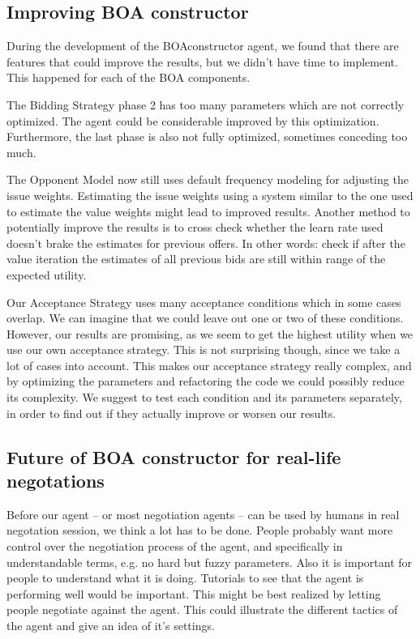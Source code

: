 \subsection{Improving BOA constructor}
During the development of the BOAconstructor agent, we found that there are features that could improve the results, but we didn't have time to implement. This happened for each of the BOA components.

The Bidding Strategy phase 2 has too many parameters which are not correctly optimized.
The agent could be considerable improved by this optimization. Furthermore, 
the last phase is also not fully optimized, sometimes conceding too much.

The Opponent Model now still uses default frequency modeling for adjusting the issue weights. Estimating the issue weights using a system similar to the one used to estimate the value weights might lead to improved results. Another method to potentially improve the results is to cross check whether the learn rate used doesn't brake the estimates for previous offers. In other words: check if after the value iteration the estimates of all previous bids are still within range of the expected utility. 

Our Acceptance Strategy uses many acceptance conditions which in some cases overlap. We can imagine that we could leave out one or two of these conditions. However, our results are promising, as we seem to get the highest utility when we use our own acceptance strategy. This is not surprising though, since we take a lot of cases into account. This makes our acceptance strategy really complex, and by optimizing the parameters and refactoring the code we could possibly reduce its complexity. We suggest to test each condition and its parameters separately, in order to find out if they actually improve or worsen our results.

\subsection{Future of BOA constructor for real-life negotations}
Before our agent -- or most negotiation agents -- can be used by humans in real negotation 
session, we think a lot has to be done. People probably want more control over the 
negotiation process of the agent, and specifically in understandable terms, e.g. no hard but fuzzy parameters.
Also it is important for people to understand what it is doing. 
Tutorials to see that the agent is performing well would be important. 
This might be best realized by letting people negotiate against the agent. 
This could illustrate the different tactics of the agent and give an idea of it's settings.

